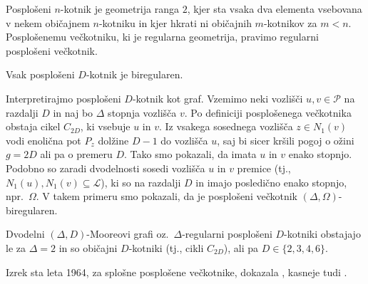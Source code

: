 \documentclass[fin1, tisk]{fmfdelo}
\newcommand{\PP}{\mathcal{P}}
\newcommand{\LL}{\mathcal{L}}
\begin{document}
\begin{definicija}\label{def:posploseni}
    Posplošeni $n$-kotnik je geometrija ranga $2$, kjer sta vsaka dva elementa vsebovana v nekem običajnem $n$-kotniku
    in kjer hkrati ni običajnih $m$-kotnikov za $m < n$. Posplošenemu večkotniku, ki je regularna geometrija, pravimo
    regularni posplošeni večkotnik.
\end{definicija}

\begin{opomba}\label{op:posploseni_biregularni}
    Vsak posplošeni $D$-kotnik je biregularen.
\end{opomba}

\begin{dokaz}
    Interpretirajmo posplošeni $D$-kotnik kot graf. Vzemimo neki vozlišči $u, v\in \PP$ na razdalji $D$ in naj bo $\Delta$ stopnja
    vozlišča $v$. Po definiciji posplošenega večkotnika obstaja cikel $C_{2D}$, ki vsebuje $u$ in $v$.
    Iz vsakega sosednega vozlišča $z\in N_1(v)$ vodi enolična pot $P_z$ dolžine $D-1$ do vozlišča $u$,
    saj bi sicer kršili pogoj o ožini $g=2D$ ali pa o premeru $D$. Tako smo pokazali, da imata $u$ in $v$ enako stopnjo.
    Podobno so zaradi dvodelnosti sosedi vozlišča $u$ in $v$ premice (tj., $N_1(u), N_1(v) \subseteq \LL$), ki so na razdalji $D$
    in imajo posledično enako stopnjo, npr.~$\Omega$. V takem primeru smo pokazali, da je posplošeni večkotnik $(\Delta, \Omega)$-biregularen.
\end{dokaz}

\begin{izrek}\label{iz:feit_higman}
    Dvodelni $(\Delta, D)$-Mooreovi grafi oz.~$\Delta$-regularni posplošeni $D$-kotniki obstajajo le
    za $\Delta = 2$ in so običajni $D$-kotniki (tj., cikli $C_{2D}$), ali pa $D\in\{2, 3, 4, 6\}$.
\end{izrek}
\begin{opomba}
    Izrek sta leta 1964, za splošne posplošene večkotnike, dokazala \textcite{feit1964nonexistence},
    kasneje tudi \textcite{kilmoyer1973theorem}. 
\end{opomba}
\end{document}

